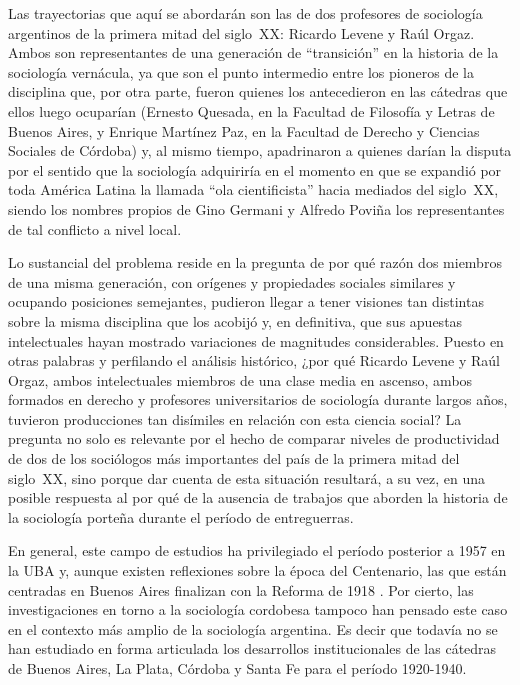 Las trayectorias que aquí se abordarán son las de dos profesores de sociología argentinos de la primera mitad del siglo~XX: Ricardo Levene y Raúl Orgaz. Ambos son representantes de una generación de \enquote{transición} en la historia de la sociología vernácula, ya que son el punto intermedio entre los pioneros de la disciplina que, por otra parte, fueron quienes los antecedieron en las cátedras que ellos luego ocuparían (Ernesto Quesada, en la Facultad de Filosofía y Letras de Buenos Aires, y Enrique Martínez Paz, en la Facultad de Derecho y Ciencias Sociales de Córdoba) y, al mismo tiempo, apadrinaron a quienes darían la disputa por el sentido que la sociología adquiriría en el momento en que se expandió por toda América Latina la llamada \enquote{ola cientificista} hacia mediados del siglo~XX, siendo los nombres propios de Gino Germani y Alfredo Poviña los representantes de tal conflicto a nivel local.

Lo sustancial del problema reside en la pregunta de por qué razón dos miembros de una misma generación, con orígenes y propiedades sociales similares y ocupando posiciones semejantes, pudieron llegar a tener visiones tan distintas sobre la misma disciplina que los acobijó y, en definitiva, que sus apuestas intelectuales hayan mostrado variaciones de magnitudes considerables. Puesto en otras palabras y perfilando el análisis histórico, ¿por qué Ricardo Levene y Raúl Orgaz, ambos intelectuales miembros de una clase media en ascenso, ambos formados en derecho y profesores universitarios de sociología durante largos años, tuvieron producciones tan disímiles en relación con esta ciencia social? La pregunta no solo es relevante por el hecho de comparar niveles de productividad de dos de los sociólogos más importantes del país de la primera mitad del siglo~XX, sino porque dar cuenta de esta situación resultará, a su vez, en una posible respuesta al por qué de la ausencia de trabajos que aborden la historia de la sociología porteña durante el período de entreguerras.

En general, este campo de estudios ha privilegiado el período posterior a 1957 en la UBA \parencite[por ejemplo][entre otros]{1450-VERON1974,1508-SIDICARO1993,1550-BLOIS2018} y, aunque existen reflexiones sobre la época del Centenario, las que están centradas en Buenos Aires finalizan con la Reforma de 1918 \parencite{1667-PEREYRA2000}. Por cierto, las investigaciones en torno a la sociología cordobesa \parencite[por ejemplo][]{1447-CARACCIOLO2010,1528-REQUENA2010,1672-GRISENDI2011} tampoco han pensado este caso en el contexto más amplio de la sociología argentina. Es decir que todavía no se han estudiado en forma articulada los desarrollos institucionales de las cátedras de Buenos Aires, La Plata, Córdoba y Santa Fe para el período 1920-1940.

